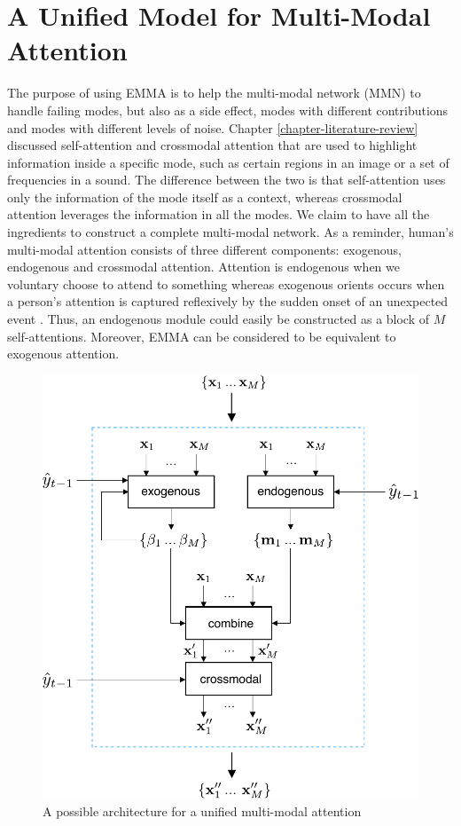 \chapter{A Unified Model for Multi-Modal Attention} 
\label{chapter-unified} 

The purpose of using EMMA is to help the multi-modal network (MMN) to handle failing modes, but also as a side effect, modes with different contributions and modes with different levels of noise. Chapter \ref{chapter-literature-review} discussed self-attention and crossmodal attention that are used to highlight information inside a specific mode, such as certain regions in an image or a set of frequencies in a sound. The difference between the two is that self-attention uses only the information of the mode itself as a context, whereas crossmodal attention leverages the information in all the modes. We claim to have all the ingredients to construct a complete multi-modal network. As a reminder, human's multi-modal attention consists of three different components: exogenous, endogenous and crossmodal attention. Attention is endogenous when we voluntary choose to attend to something whereas exogenous orients occurs when a person's attention is captured reflexively by the sudden onset of an unexpected event \citep{crossmodal}. Thus, an endogenous module could easily be constructed as a block of $M$ self-attentions. Moreover, EMMA can be considered to be equivalent to exogenous attention. 

\begin{figure}[hbt!]
\centering
\includegraphics[scale=0.5]{figures/unified}
\caption{A possible architecture for a unified multi-modal attention}
\label{fig:complete-model}
\end{figure}

